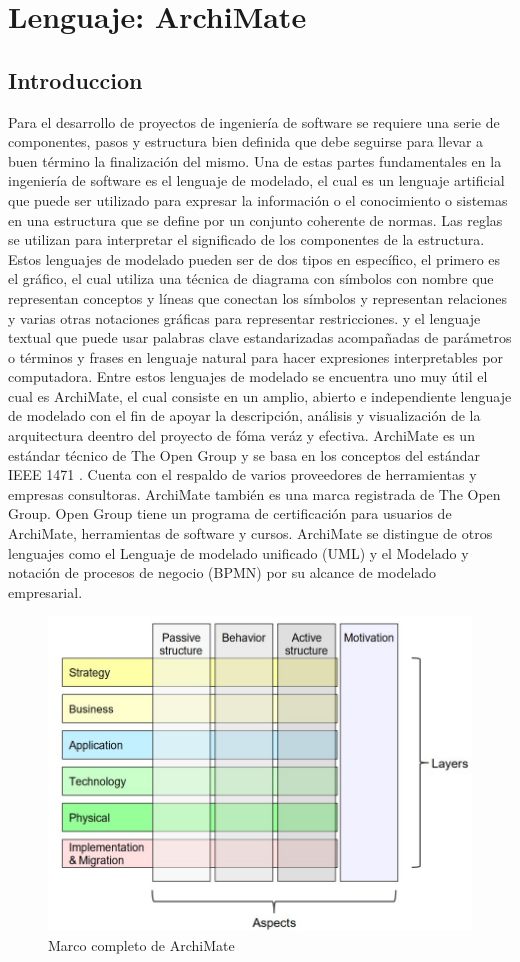 \chapter{Lenguaje: ArchiMate}
\section{Introduccion}
Para el desarrollo de proyectos de ingeniería de software se requiere una serie de componentes, pasos y estructura bien definida que debe seguirse para llevar a buen término la finalización del mismo. Una de estas partes fundamentales en la ingeniería de software es el lenguaje de modelado, el cual es un lenguaje artificial que puede ser utilizado para expresar la información o el conocimiento o sistemas en una estructura que se define por un conjunto coherente de normas. Las reglas se utilizan para interpretar el significado de los componentes de la estructura. Estos lenguajes de modelado pueden ser de dos tipos en específico, el primero es el gráfico, el cual utiliza una técnica de diagrama con símbolos con nombre que representan conceptos y líneas que conectan los símbolos y representan relaciones y varias otras notaciones gráficas para representar restricciones. y el lenguaje textual que puede usar palabras clave estandarizadas acompañadas de parámetros o términos y frases en lenguaje natural para hacer expresiones interpretables por computadora. Entre estos lenguajes de modelado se encuentra uno muy útil el cual es ArchiMate, el cual consiste en un amplio, abierto e independiente lenguaje de modelado con el fin de apoyar la descripción, análisis y visualización de la arquitectura deentro del proyecto de fóma veráz y efectiva. ArchiMate es un estándar técnico de The Open Group y se basa en los conceptos del estándar IEEE 1471 . Cuenta con el respaldo de varios proveedores de herramientas y empresas consultoras. ArchiMate también es una marca registrada de The Open Group. Open Group tiene un programa de certificación para usuarios de ArchiMate, herramientas de software y cursos. ArchiMate se distingue de otros lenguajes como el Lenguaje de modelado unificado (UML) y el Modelado y notación de procesos de negocio (BPMN) por su alcance de modelado empresarial.

\begin{figure}[h!]
	\centering
	\includegraphics[width=0.7\linewidth]{imgs/coreFramwork}
	\caption{Marco completo de ArchiMate}
\end{figure}

